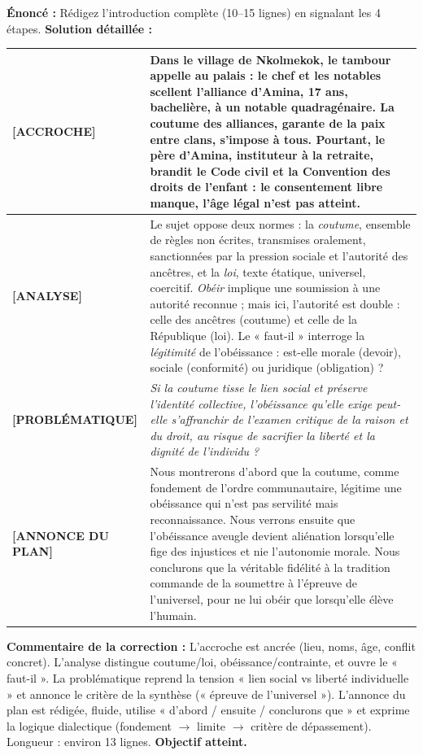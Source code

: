 \documentclass[11pt]{article}
\begin{document}
\begin{exoresolu}
\textbf{Énoncé :} Rédigez l'introduction complète (10--15 lignes) en signalant les 4 étapes.
\tcblower
\textbf{Solution détaillée :}

\begin{center}
\begin{tabularx}{\linewidth}{|>{\bfseries\color{popblue}}p{2.2cm}|X|}
\hline
\textbf{[ACCROCHE]} & Dans le village de Nkolmekok, le tambour appelle au palais : le chef et les notables scellent l'alliance d'Amina, 17 ans, bachelière, à un notable quadragénaire. La coutume des alliances, garante de la paix entre clans, s'impose à tous. Pourtant, le père d'Amina, instituteur à la retraite, brandit le Code civil et la Convention des droits de l'enfant : le consentement libre manque, l'âge légal n'est pas atteint. \\ \hline
\textbf{[ANALYSE]} & Le sujet oppose deux normes : la \emph{coutume}, ensemble de règles non écrites, transmises oralement, sanctionnées par la pression sociale et l'autorité des ancêtres, et la \emph{loi}, texte étatique, universel, coercitif. \emph{Obéir} implique une soumission à une autorité reconnue ; mais ici, l'autorité est double : celle des ancêtres (coutume) et celle de la République (loi). Le « faut-il » interroge la \emph{légitimité} de l'obéissance : est-elle morale (devoir), sociale (conformité) ou juridique (obligation) ? \\ \hline
\textbf{[PROBLÉMATIQUE]} & \emph{Si la coutume tisse le lien social et préserve l'identité collective, l'obéissance qu'elle exige peut-elle s'affranchir de l'examen critique de la raison et du droit, au risque de sacrifier la liberté et la dignité de l'individu ?} \\ \hline
\textbf{[ANNONCE DU PLAN]} & Nous montrerons d'abord que la coutume, comme fondement de l'ordre communautaire, légitime une obéissance qui n'est pas servilité mais reconnaissance. Nous verrons ensuite que l'obéissance aveugle devient aliénation lorsqu'elle fige des injustices et nie l'autonomie morale. Nous conclurons que la véritable fidélité à la tradition commande de la soumettre à l'épreuve de l'universel, pour ne lui obéir que lorsqu'elle élève l'humain. \\ \hline
\end{tabularx}
\end{center}

\textbf{Commentaire de la correction :} L'accroche est ancrée (lieu, noms, âge, conflit concret). L'analyse distingue coutume/loi, obéissance/contrainte, et ouvre le « faut-il ». La problématique reprend la tension « lien social vs liberté individuelle » et annonce le critère de la synthèse (« épreuve de l'universel »). L'annonce du plan est rédigée, fluide, utilise « d'abord / ensuite / conclurons que » et exprime la logique dialectique (fondement $\rightarrow$ limite $\rightarrow$ critère de dépassement). Longueur : environ 13 lignes. \textbf{Objectif atteint.}
\end{exoresolu}
\end{document}
